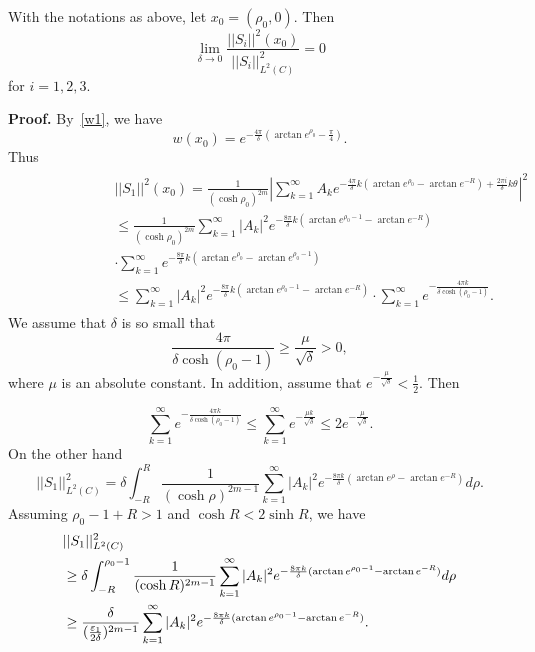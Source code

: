\begin{lemma} With the notations as above, let
$x_0=(\rho_0,0)$. Then
\[
\underset{\delta\rightarrow 0}{\lim}\frac{||S_i||^2(x_0)}
{||S_i||^2_{L^2(C)}}=0
\]
for $i=1,2,3$.
\end{lemma}

{\bf Proof.} By~\eqref{w1}, we have 
\[
w(x_0)=e^{-\frac{4\pi}{\delta}(\arctan e^{\rho_0}-\frac\pi 4)}.
\]
Thus
\begin{align}\label{s1}
\begin{split}
&||S_1||^2(x_0)=\frac{1}{(\cosh\rho_0)^{2m}}
|\sum_{k=1}^\infty A_ke^{-\frac{4\pi}{\delta}k(\arctan e^{\rho_0}
-\arctan e^{-R})+\frac{2\pi i}{\delta}k\theta}|^2\\
&\leq
\frac{1}{(\cosh\rho_0)^{2m}}
\sum_{k=1}^\infty |A_k|^2e^{-\frac{8\pi}{\delta}k(\arctan
e^{\rho_0-1}
-\arctan e^{-R})}\\
\qquad\qquad\qquad
&\cdot
\sum_{k=1}^\infty e^{-\frac{8\pi}{\delta}k(\arctan e^{\rho_0}-\arctan 
e^{\rho_0-1})}\\
&\leq\sum_{k=1}^\infty|A_k|^2e^{-\frac{8\pi}{\delta}k
(\arctan e^{\rho_0-1}-\arctan e^{-R})}\cdot
\sum_{k=1}^{\infty}e^{-\frac{4\pi k}{\delta\cosh(\rho_0-1)}}.
\end{split}
\end{align}
We assume that $\delta$ is so small that
\[
\frac{4\pi}{\delta\cosh(\rho_0-1)}\geq\frac{\mu}{\sqrt{\delta}}>0,
\]
where $\mu$ is an absolute constant. In addition, assume that
$e^{-\frac{\mu}{\sqrt{\delta}}}<\frac 12$. Then

\begin{equation}\label{s1-1}
\sum_{k=1}^\infty e^{-\frac{4\pi k}{\delta\cosh(\rho_0-1)}}
\leq\sum_{k=1}^\infty e^{-\frac{\mu k}{\sqrt{\delta}}}
\leq 2e^{-\frac{\mu}{\sqrt{\delta}}}.
\end{equation}
On the other hand
\[
||S_1||^2_{L^2(C)}=\delta\int_{-R}^R\frac{1}{
(\cosh\rho)^{2m-1}}\sum_{k=1}^\infty |A_k|^2 e^{-\frac{8\pi k}
{\delta} (\arctan e^\rho-\arctan e^{-R})} d\rho.
\]
Assuming $\rho_0-1+R>1$ and $\cosh R<2\sinh R$, we have
\begin{align}\label{s1-2}
\begin{split}
&||S_1||^2_{L^2(C)}\\
&\geq\delta\int_{-R}^{\rho_0-1}
\frac{1}{(\cosh R)^{2m-1}}\sum_{k=1}^\infty
|A_k|^2 e^{-\frac{8\pi k}{\delta}(\arctan e^{\rho_0-1}
-\arctan e^{-R})} d\rho\\
&\geq \frac{\delta}{(\frac{\varepsilon_1}{2\delta})^{2m-1}}
\sum_{k=1}^\infty |A_k|^2 e^{-\frac{8\pi k}{\delta}
(\arctan e^{\rho_0-1}-\arctan e^{-R})}.
\end{split}
\end{align}

